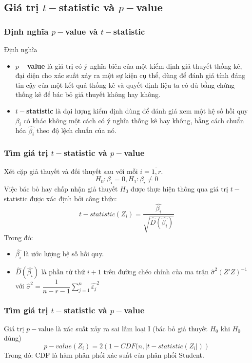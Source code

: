 \subsection{Giá trị $t-$statistic và $p-$value}
\begin{frame}
\frametitle{Định nghĩa $p-$value và $t-$statistic}
\begin{block}{Định nghĩa}
\begin{itemize}
   \item \textbf{$p-$value} là giá trị có ý nghĩa biên của một kiểm định giả thuyết thống kê, đại diện cho xác suất xảy ra một sự kiện cụ thể, dùng để đánh giá tính đáng tin cậy của một kết quả thống kê và quyết định liệu ta có đủ bằng chứng thống kê để bác bỏ giả thuyết không hay không.
   \item \textbf{$t-$statistic} là đại lượng kiểm định dùng để đánh giá xem một hệ số hồi quy $\beta_i$ có khác không một cách có ý nghĩa thống kê hay không, bằng cách chuẩn hóa $\widehat{\beta_i}$ theo độ lệch chuẩn của nó.
\end{itemize}
\end{block}
\end{frame}
\begin{frame}
\frametitle{Tìm giá trị $t-$statistic và $p-$value}
   Xét cặp giả thuyết và đối thuyết sau với mỗi $i=\overline{1,r}$.
   \[
   H_0: \beta_i = 0, H_1: \beta_i \ne 0  
   \]
   Việc bác bỏ hay chấp nhận giả thuyết $H_0$ được thực hiện thông qua giá trị $t-$statistic được xác định bởi công thức:
       \[
       t-statistic(Z_i) = \dfrac{\widehat{\beta_i}}{\sqrt{\widehat{D}\left(\widehat{\beta_i}\right)}}
       \]
       Trong đó:
      \begin{itemize}
           \item $\widehat{\beta_i}$ là ước lượng hệ số hồi quy.
           \item $\widehat{D}\left(\widehat{\beta_i}\right)$ là phần tử thứ $i+1$ trên đường chéo chính của ma trận $\widehat{\sigma}^2\left(Z'Z\right)^{-1}$ với $\widehat{\sigma}^2 = \dfrac{1}{n-r-1}\sum_{j=1}^{n}{\widehat{\varepsilon_j}}^2$
       \end{itemize}
       
\end{frame}
\begin{frame}
\frametitle{Tìm giá trị $t-$statistic và $p-$value}
Giá trị $p-$value là xác suất xảy ra sai lầm loại I (bác bỏ giả thuyết $H_0$ khi $H_0$ đúng)
\[
p-value \left(Z_i\right) = 2 \left(1-CDF(n,|t-statistic(Z_i|)\right)
\]
Trong đó: CDF là hàm phân phối xác suất của phân phối Student.
\end{frame}
